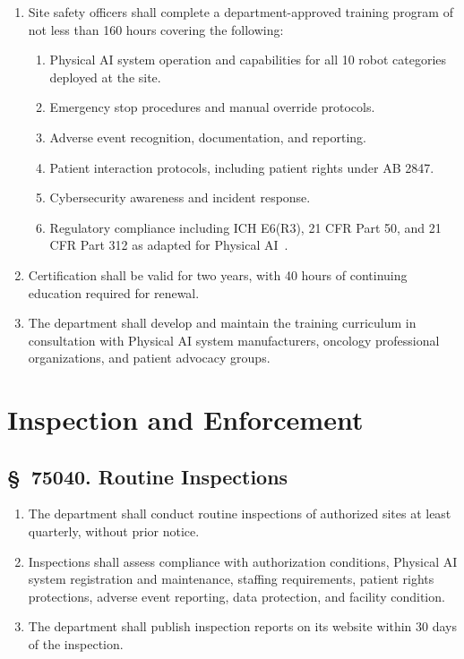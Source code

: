 \begin{enumerate}[label=(\alph*)]
\item Site safety officers shall complete a department-approved training program
  of not less than 160 hours covering the following:
  \begin{enumerate}[label=(\arabic*)]
  \item Physical AI system operation and capabilities for all 10 robot
    categories deployed at the site.
  \item Emergency stop procedures and manual override protocols.
  \item Adverse event recognition, documentation, and reporting.
  \item Patient interaction protocols, including patient rights under AB 2847.
  \item Cybersecurity awareness and incident response.
  \item Regulatory compliance including ICH E6(R3), 21 CFR Part 50, and
    21 CFR Part 312 as adapted for Physical AI~\cite{iche6r3adapt,cfr50adapt,cfr312adapt}.
  \end{enumerate}

\item Certification shall be valid for two years, with 40 hours of continuing
  education required for renewal.

\item The department shall develop and maintain the training curriculum in
  consultation with Physical AI system manufacturers, oncology professional
  organizations, and patient advocacy groups.
\end{enumerate}

\section{Inspection and Enforcement}

\subsection{\S~75040. Routine Inspections}

\begin{enumerate}[label=(\alph*)]
\item The department shall conduct routine inspections of authorized sites at
  least quarterly, without prior notice.

\item Inspections shall assess compliance with authorization conditions,
  Physical AI system registration and maintenance, staffing requirements,
  patient rights protections, adverse event reporting, data protection, and
  facility condition.

\item The department shall publish inspection reports on its website within 30
  days of the inspection.
\end{enumerate}

